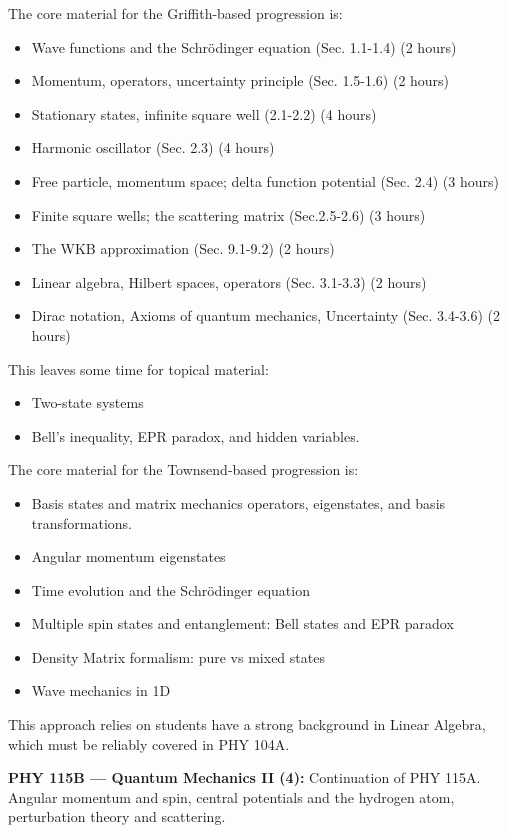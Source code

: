 \documentclass[12pt]{article}
\begin{document}
The core material for the Griffith-based progression is: 
\begin{itemize}
\item Wave functions and the Schr\"odinger equation (Sec. 1.1-1.4) (2 hours)
\item Momentum, operators, uncertainty principle (Sec. 1.5-1.6) (2 hours)
\item Stationary states, infinite square well (2.1-2.2) (4 hours)
\item Harmonic oscillator (Sec. 2.3) (4 hours)
\item Free particle, momentum space; delta function potential (Sec. 2.4) (3 hours)
\item Finite square wells; the scattering matrix (Sec.2.5-2.6) (3 hours)
\item The WKB approximation (Sec. 9.1-9.2) (2 hours)
\item Linear algebra, Hilbert spaces, operators (Sec. 3.1-3.3) (2 hours)
\item Dirac notation, Axioms of quantum mechanics, Uncertainty  (Sec. 3.4-3.6) (2 hours)
\end{itemize}
This leaves some time for topical material:
\begin{itemize}
\item Two-state systems
\item Bell's inequality, EPR paradox, and hidden variables.
\end{itemize}

The core material for the Townsend-based progression is: 
\begin{itemize}
\item Basis states and matrix mechanics operators, eigenstates, and
  basis transformations.
\item Angular momentum eigenstates
\item Time evolution and the Schr\"odinger equation
\item Multiple spin states and entanglement: Bell states and EPR paradox
\item Density Matrix formalism: pure vs mixed states
\item Wave mechanics in 1D
\end{itemize}
This approach relies on students have a strong background in Linear Algebra, which must be reliably covered in PHY 104A.

\vskip 1cm
\noindent
{\bf PHY 115B --- Quantum Mechanics II (4):}
Continuation of PHY 115A.  Angular momentum and spin, central potentials and the hydrogen atom, perturbation theory and scattering.
\end{document}

